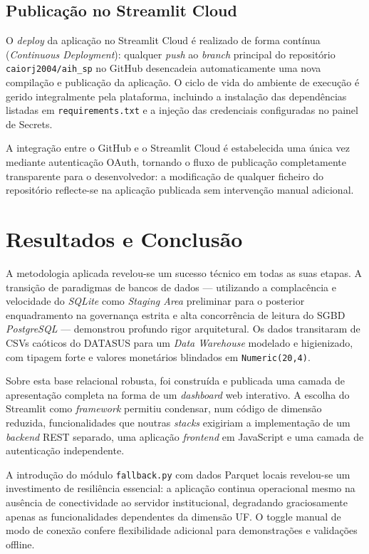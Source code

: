 \documentclass[12pt,a4paper]{report}
\begin{document}
\section{Publicação no Streamlit Cloud}

O \textit{deploy} da aplicação no Streamlit Cloud é realizado de forma contínua
(\textit{Continuous Deployment}): qualquer \textit{push} ao \textit{branch} principal
do repositório \texttt{caiorj2004/aih\_sp} no GitHub desencadeia automaticamente uma
nova compilação e publicação da aplicação. O ciclo de vida do ambiente de execução é
gerido integralmente pela plataforma, incluindo a instalação das dependências listadas
em \texttt{requirements.txt} e a injeção das credenciais configuradas no painel de
Secrets.

A integração entre o GitHub e o Streamlit Cloud é estabelecida uma única vez mediante
autenticação OAuth, tornando o fluxo de publicação completamente transparente para o
desenvolvedor: a modificação de qualquer ficheiro do repositório reflecte-se na
aplicação publicada sem intervenção manual adicional.

\chapter{Resultados e Conclusão}

A metodologia aplicada revelou-se um sucesso técnico em todas as suas etapas.
A transição de paradigmas de bancos de dados — utilizando a complacência e velocidade
do \textit{SQLite} como \textit{Staging Area} preliminar para o posterior enquadramento
na governança estrita e alta concorrência de leitura do SGBD \textit{PostgreSQL} —
demonstrou profundo rigor arquitetural. Os dados transitaram de CSVs caóticos do
DATASUS para um \textit{Data Warehouse} modelado e higienizado, com tipagem forte e
valores monetários blindados em \texttt{Numeric(20,4)}.

Sobre esta base relacional robusta, foi construída e publicada uma camada de
apresentação completa na forma de um \textit{dashboard} web interativo. A escolha do
Streamlit como \textit{framework} permitiu condensar, num código de dimensão reduzida,
funcionalidades que noutras \textit{stacks} exigiriam a implementação de um
\textit{backend} REST separado, uma aplicação \textit{frontend} em JavaScript e uma
camada de autenticação independente.

A introdução do módulo \texttt{fallback.py} com dados Parquet locais revelou-se um
investimento de resiliência essencial: a aplicação continua operacional mesmo na
ausência de conectividade ao servidor institucional, degradando graciosamente apenas as
funcionalidades dependentes da dimensão UF. O toggle manual de modo de conexão confere
flexibilidade adicional para demonstrações e validações offline.
\end{document}

